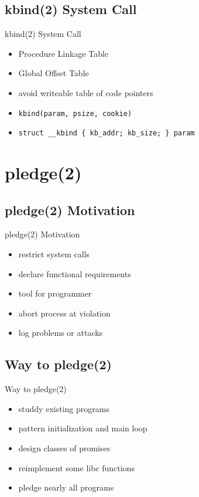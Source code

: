 \documentclass[14pt]{beamer}
\begin{document}
\subsection{kbind(2) System Call}
\begin{frame}{kbind(2) System Call}
\begin{itemize}
    \item Procedure Linkage Table
    \item Global Offset Table
    \item avoid writeable table of code pointers
    \item \texttt{kbind(param, psize, cookie)}
    \item \texttt{struct \_\_kbind \{ kb\_addr; kb\_size; \} param}
\end{itemize}
\end{frame}

\section{pledge(2)}

\subsection{pledge(2) Motivation}
\begin{frame}{pledge(2) Motivation}
\begin{itemize}
    \item restrict system calls
    \item declare functional requirements
    \item tool for programmer
    \item abort process at violation
    \item log problems or attacks
\end{itemize}
\end{frame}

\subsection{Way to pledge(2)}
\begin{frame}{Way to pledge(2)}
\begin{itemize}
    \item studdy existing programs
    \item pattern initialization and main loop
    \item design classes of promises
    \item reimplement some libc functions
    \item pledge nearly all programs
\end{itemize}
\end{frame}
\end{document}
